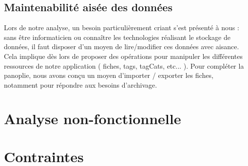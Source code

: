 \subsection*{Maintenabilité aisée des données}

Lors de notre analyse, un besoin particulièrement criant s'est présenté à nous : sans être informaticien ou connaître les technologies réalisant le stockage de données, il faut disposer d'un moyen de lire/modifier ces données avec aisance. \\

Cela implique dès lors de proposer des opérations pour manipuler les différentes ressources de notre application ( \glspl{fiche}, \glspl{tag}, \glspl{tagCat}, etc... ). Pour compléter la panoplie, nous avons conçu un moyen d'importer / exporter les \glspl{fiche}, notamment pour répondre aux besoins d'archivage.

\pagebreak


\section{Analyse non-fonctionnelle}

\section {Contraintes}
